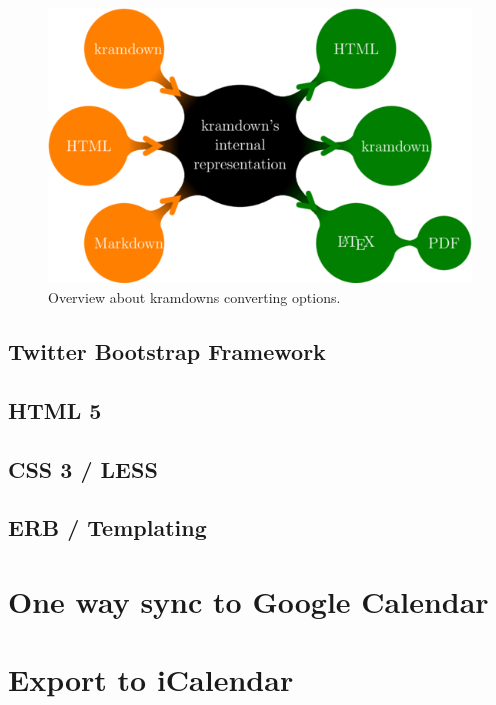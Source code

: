 \begin{figure}[htb]
\centering
\includegraphics[width=\textwidth]{figures/kramdown}
\caption{Overview about kramdowns converting options. \cite{kramdown}}
\label{fig:kramdown}
\end{figure}

\subsection{Twitter Bootstrap Framework}

\subsection{HTML 5}

\subsection{CSS 3 / LESS}

\subsection{ERB / Templating}

\section{One way sync to Google Calendar}

\section{Export to iCalendar}

